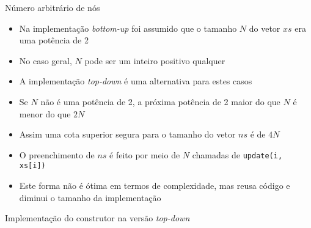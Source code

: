 \begin{frame}[fragile]{Número arbitrário de nós}

    \begin{itemize}
        \item Na implementação \textit{bottom-up} foi assumido que o tamanho $N$ do vetor
            $xs$ era uma potência de 2

        \item No caso geral, $N$ pode ser um inteiro positivo qualquer

        \item A implementação \textit{top-down} é uma alternativa para estes casos

        \item Se $N$ não é uma potência de 2, a próxima potência de 2 maior do que $N$ é menor
            do que $2N$

        \item Assim uma cota superior segura para o tamanho do vetor $ns$ é de $4N$

        \item O preenchimento de $ns$ é feito por meio de $N$ chamadas de \texttt{update(i, xs[i])}

        \item Este forma não é ótima em termos de complexidade, mas reusa código e diminui o
            tamanho da implementação

    \end{itemize}

\end{frame}

\begin{frame}[fragile]{Implementação do construtor na versão {\it top-down}}
\end{frame}

